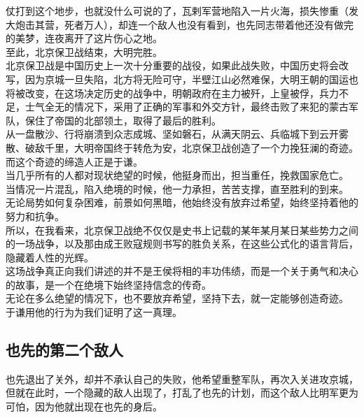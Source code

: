 \begin{multicols}{\theparacolNo}
仗打到这个地步，也就没什么可说的了，瓦剌军营地陷入一片火海，损失惨重（发大炮击其营，死者万人），却连一个敌人也没有看到，也先同志带着他还没有做完的美梦，连夜离开了这片伤心之地。\\

至此，北京保卫战结束，大明完胜。\\

北京保卫战是中国历史上一次十分重要的战役，如果此战失败，中国历史将会改写，因为京城一旦失陷，北方将无险可守，半壁江山必然难保，大明王朝的国运也将被改变，在这场决定历史的战争中，明朝政府在主力被歼，上皇被俘，兵力不足，士气全无的情况下，采用了正确的军事和外交方针，最终击败了来犯的蒙古军队，保住了帝国的北部领土，取得了最后的胜利。\\

从一盘散沙、行将崩溃到众志成城、坚如磐石，从满天阴云、兵临城下到云开雾散、破敌千里，大明帝国终于转危为安，北京保卫战创造了一个力挽狂澜的奇迹。而这个奇迹的缔造人正是于谦。\\

当几乎所有的人都对现状绝望的时候，他挺身而出，担当重任，挽救国家危亡。\\

当情况一片混乱，陷入绝境的时候，他一力承担，苦苦支撑，直至胜利的到来。\\

无论局势如何复杂困难，前景如何黑暗，他始终没有放弃过希望，始终坚持着他的努力和抗争。\\

所以，在我看来，北京保卫战绝不仅仅是史书上记载的某年某月某日某些势力之间的一场战争，以及那由成王败寇规则书写的胜负关系，在这些公式化的语言背后，隐藏着人性的光辉。\\

这场战争真正向我们讲述的并不是王侯将相的丰功伟绩，而是一个关于勇气和决心的故事，是一个在绝境下始终坚持信念的传奇。\\

无论在多么绝望的情况下，也不要放弃希望，坚持下去，就一定能够创造奇迹。\\

于谦用他的行为为我们证明了这一真理。\\

\subsection{也先的第二个敌人}
也先退出了关外，却并不承认自己的失败，他希望重整军队，再次入关进攻京城，但就在此时，一个隐藏的敌人出现了，打乱了也先的计划，而这个敌人比明军更为可怕，因为他就出现在也先的身后。\\


\end{multicols}
